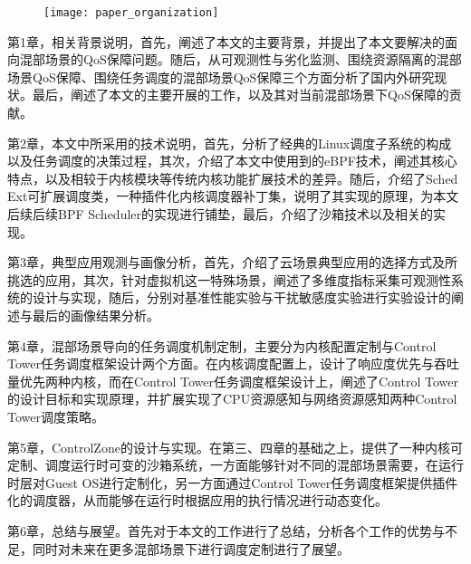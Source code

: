 \begin{figure}[!htbp]
    \centering
    \texttt{[image: paper\_organization]}
    \label{fig:paper_organization}
\end{figure}

第1章，相关背景说明，首先，阐述了本文的主要背景，并提出了本文要解决的面向混部场景的QoS保障问题。随后，从可观测性与劣化监测、围绕资源隔离的混部场景QoS保障、围绕任务调度的混部场景QoS保障三个方面分析了国内外研究现状。最后，阐述了本文的主要开展的工作，以及其对当前混部场景下QoS保障的贡献。

第2章，本文中所采用的技术说明，首先，分析了经典的Linux调度子系统的构成以及任务调度的决策过程，其次，介绍了本文中使用到的eBPF技术，阐述其核心特点，以及相较于内核模块等传统内核功能扩展技术的差异。随后，介绍了Sched Ext可扩展调度类，一种插件化内核调度器补丁集，说明了其实现的原理，为本文后续后续BPF Scheduler的实现进行铺垫，最后，介绍了沙箱技术以及相关的实现。

第3章，典型应用观测与画像分析，首先，介绍了云场景典型应用的选择方式及所挑选的应用，其次，针对虚拟机这一特殊场景，阐述了多维度指标采集可观测性系统的设计与实现，随后，分别对基准性能实验与干扰敏感度实验进行实验设计的阐述与最后的画像结果分析。

第4章，混部场景导向的任务调度机制定制，主要分为内核配置定制与Control Tower任务调度框架设计两个方面。在内核调度配置上，设计了响应度优先与吞吐量优先两种内核，而在Control Tower任务调度框架设计上，阐述了Control Tower的设计目标和实现原理，并扩展实现了CPU资源感知与网络资源感知两种Control Tower调度策略。

第5章，ControlZone的设计与实现。在第三、四章的基础之上，提供了一种内核可定制、调度运行时可变的沙箱系统，一方面能够针对不同的混部场景需要，在运行时层对Guest OS进行定制化，另一方面通过Control Tower任务调度框架提供插件化的调度器，从而能够在运行时根据应用的执行情况进行动态变化。

第6章，总结与展望。首先对于本文的工作进行了总结，分析各个工作的优势与不足，同时对未来在更多混部场景下进行调度定制进行了展望。